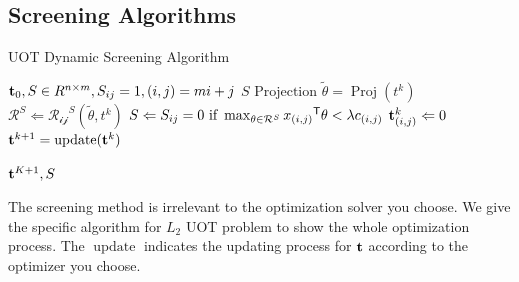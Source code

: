 \subsection{Screening Algorithms}

 \begin{algorithm}
 \caption{UOT Dynamic Screening Algorithm}
 \begin{algorithmic}[h]
 \renewcommand{\algorithmicrequire}{\textbf{Input:}}
 \renewcommand{\algorithmicensure}{\textbf{Output:}}
 \REQUIRE $\mathbf t_0, S \in R^{n\times m}, S_{ij}=1, (i,j) = mi+j$
 \ENSURE $S$
 \STATE {}
 \STATE $\text{Projection } \tilde{\theta} = \operatorname{Proj}(t^k)$ 
  \STATE $\mathcal{R}^{S} \Leftarrow \mathcal{R_{ij}}^S{(\tilde{\theta},t^k)}$
   \STATE $S \Leftarrow {S_{ij} = 0 \text{ if } \max_{\theta \in \mathcal{R}^S} {x_{(i,j)}}^{\mathsf T}\theta <\lambda c_{(i,j)} }$
 \ENDFOR
  \ENDFOR
  \STATE $\mathbf t^k_{(i,j)} \Leftarrow 0$
  \ENDFOR
  \STATE $\mathbf t^{k+1} = \operatorname{update}(\mathbf t^k)$
 \ENDFOR
  
 \RETURN $\mathbf t^{K+1}, S $ 
 \end{algorithmic} 
 \end{algorithm}

The screening method is irrelevant to the optimization solver you choose. We give the specific algorithm for $L_2$ UOT problem to show the whole optimization process. The $\operatorname{update}$ indicates the updating process for $\mathbf t$ according to the optimizer you choose.\\











































